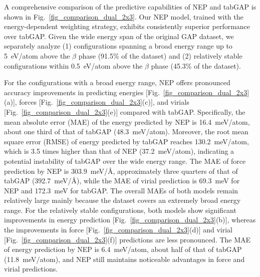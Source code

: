 \documentclass[%
reprint,
superscriptaddress,
 amsmath,amssymb,
 aps,
]{revtex4-2}
\newcommand{\meVA}{meV/$\text{\AA}$}
\begin{document}
A comprehensive comparison of the predictive capabilities of NEP and tabGAP is
shown in Fig.~\ref{fig_comparison_dual_2x3}. Our NEP model, trained with the
energy-dependent weighting strategy, exhibits consistently superior performance
over tabGAP.
Given the wide energy span of the original GAP dataset, we separately analyze
(1) configurations spanning a broad energy range up to 5~eV/atom above the $\beta$ phase 
(91.5\% of the dataset) and (2) relatively stable configurations within 
0.5~eV/atom above the $\beta$ phase (45.3\% of the dataset).

For the configurations with a broad energy range, NEP offers pronounced accuracy
improvements in predicting energies
[Fig.~\ref{fig_comparison_dual_2x3}(a)],
forces
[Fig.~\ref{fig_comparison_dual_2x3}(c)],
and virials
[Fig.~\ref{fig_comparison_dual_2x3}(e)]
compared with tabGAP.
Specifically, the mean absolute error (MAE) of the energy predicted by NEP is
16.4~meV/atom, about one third of that of tabGAP (48.3~meV/atom).
Moreover, the root mean square error (RMSE) of energy predicted by tabGAP
reaches 130.2~meV/atom, which is 3.5 times higher than that of NEP
(37.2~meV/atom), indicating a potential instability of tabGAP over the wide
energy range.
The MAE of force prediction by NEP is 303.9~\meVA, approximately three quarters
of that of tabGAP (392.7~\meVA), while the MAE of virial prediction is
69.3~meV for NEP and 172.3~meV for tabGAP.
The overall MAEs of both models remain relatively large mainly because the dataset
covers an extremely broad energy range.
For the relatively stable configurations, both models show significant improvements in
energy prediction
[Fig.~\ref{fig_comparison_dual_2x3}(b)],
whereas the improvements in force
[Fig.~\ref{fig_comparison_dual_2x3}(d)]
and virial
[Fig.~\ref{fig_comparison_dual_2x3}(f)]
predictions are less pronounced.
The MAE of energy prediction by NEP is 6.4~meV/atom, about half of that of
tabGAP (11.8~meV/atom), and NEP still maintains noticeable advantages in force
and virial predictions.
\end{document}
